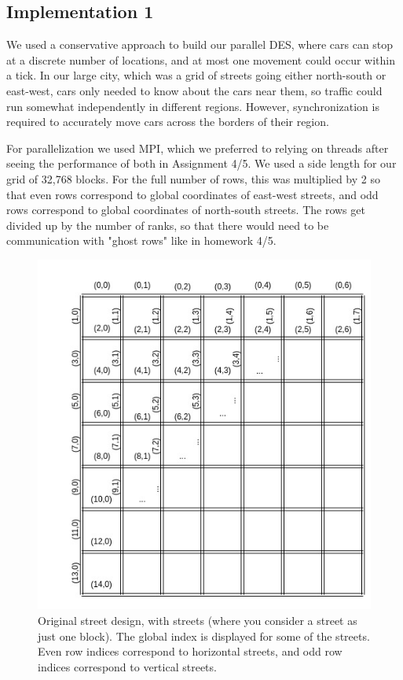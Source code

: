 \documentclass[10pt,a4paper]{article}
\begin{document}
    \subsection{Implementation 1}
    
    We used a conservative approach to build our parallel DES, where cars can stop at a discrete number of locations, and at most one movement could occur within a tick. In our large city, which was a grid of streets going either north-south or east-west, cars only needed to know about the cars near them, so traffic could run somewhat independently in different regions. However, synchronization is required to accurately move cars across the borders of their region.
    
    For parallelization we used MPI, which we preferred to relying on threads after seeing the performance of both in Assignment 4/5. We used a side length for our grid of 32,768 blocks. For the full number of rows, this was multiplied by 2 so that even rows correspond to global coordinates of east-west streets, and odd rows correspond to global coordinates of north-south streets. The rows get divided up by the number of ranks, so that there would need to be communication with "ghost rows" like in homework 4/5.
    
    \begin{figure}
        \centering
        \includegraphics[scale=0.4]{parallel.jpg}
        \caption{Original street design, with  streets (where you consider a street as just one block). The global index is displayed for some of the streets. Even row indices correspond to horizontal streets, and odd row indices correspond to vertical streets.}
        \label{fig:my_label}
    \end{figure}
    
\end{document}
